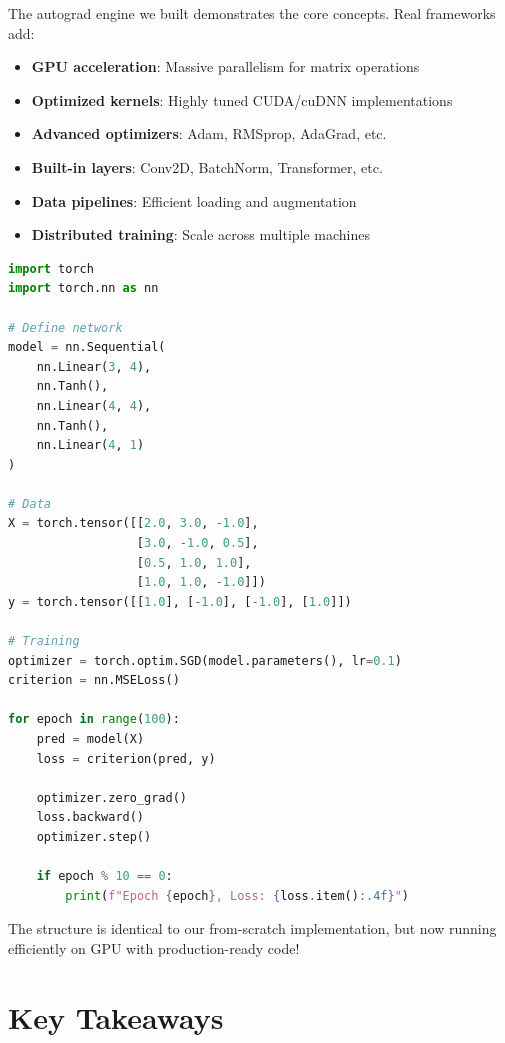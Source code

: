 The autograd engine we built demonstrates the core concepts. Real frameworks add:

\begin{itemize}
    \item \textbf{GPU acceleration}: Massive parallelism for matrix operations
    \item \textbf{Optimized kernels}: Highly tuned CUDA/cuDNN implementations
    \item \textbf{Advanced optimizers}: Adam, RMSprop, AdaGrad, etc.
    \item \textbf{Built-in layers}: Conv2D, BatchNorm, Transformer, etc.
    \item \textbf{Data pipelines}: Efficient loading and augmentation
    \item \textbf{Distributed training}: Scale across multiple machines
\end{itemize}

\begin{lstlisting}[language=Python, caption={Same Network in PyTorch}]
import torch
import torch.nn as nn

# Define network
model = nn.Sequential(
    nn.Linear(3, 4),
    nn.Tanh(),
    nn.Linear(4, 4),
    nn.Tanh(),
    nn.Linear(4, 1)
)

# Data
X = torch.tensor([[2.0, 3.0, -1.0],
                  [3.0, -1.0, 0.5],
                  [0.5, 1.0, 1.0],
                  [1.0, 1.0, -1.0]])
y = torch.tensor([[1.0], [-1.0], [-1.0], [1.0]])

# Training
optimizer = torch.optim.SGD(model.parameters(), lr=0.1)
criterion = nn.MSELoss()

for epoch in range(100):
    pred = model(X)
    loss = criterion(pred, y)
    
    optimizer.zero_grad()
    loss.backward()
    optimizer.step()
    
    if epoch % 10 == 0:
        print(f"Epoch {epoch}, Loss: {loss.item():.4f}")
\end{lstlisting}

The structure is identical to our from-scratch implementation, but now running efficiently on GPU with production-ready code!

\section{Key Takeaways}

